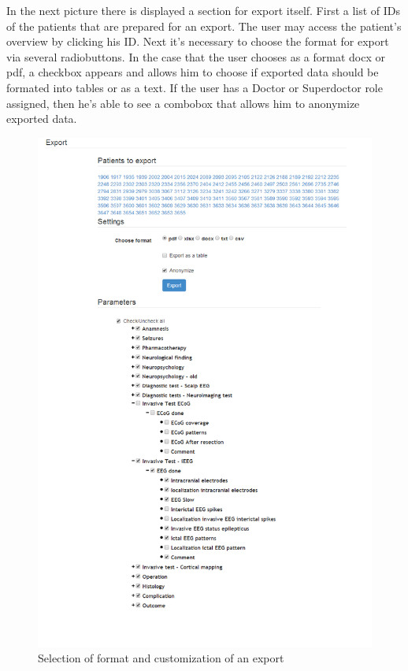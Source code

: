 \documentclass[thesis=B,english]{FITthesis}[2012/10/20]
\begin{document}
In the next picture there is displayed a section for export itself. First a list of IDs of the patients that are prepared for an export. The user may access the patient's overview by clicking his ID. Next it's necessary to choose the format for export via several radiobuttons. In the case that the user chooses as a format docx or pdf, a checkbox appears and allows him to choose if exported data should be formated into tables or as a text. If the user has a Doctor or Superdoctor role assigned, then he's able to see a combobox that allows him to anonymize exported data.

\begin{figure}[ht]\centering
\includegraphics[width=0.6\paperwidth]{export}
		\caption{Selection of format and customization of an export}
\end{figure}
\end{document}
